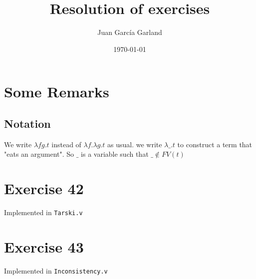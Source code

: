 \documentclass{article}
\title{Resolution of exercises}
\author{Juan García Garland}
\date{\today}
\begin{document}
\maketitle

\newpage
  
\section*{Some Remarks}

\subsection*{Notation}
We write $\lambda f g . t$ instead of $\lambda f . \lambda g . t$ as usual.
we write $\lambda \_ . t$ to construct a term that "eats an argument". So
$\_$ is a variable such that $\_ \notin FV(t)$




\newpage


\newpage



\newpage



\newpage



\newpage




\newpage



\newpage



\newpage



\newpage



\newpage

\section*{Exercise 42}
Implemented in {\tt Tarski.v}

\section*{Exercise 43}

Implemented in {\tt Inconsistency.v}
\end{document}
